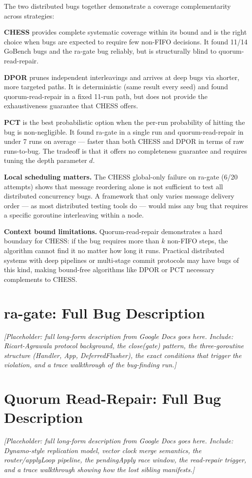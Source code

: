 \documentclass[11pt]{article}
\begin{document}
The two distributed bugs together demonstrate a coverage complementarity across strategies:

\textbf{CHESS} provides complete systematic coverage within its bound and is the right choice when bugs are expected to require few non-FIFO decisions. It found 11/14 GoBench bugs and the ra-gate bug reliably, but is structurally blind to quorum-read-repair.

\textbf{DPOR} prunes independent interleavings and arrives at deep bugs via shorter, more targeted paths. It is deterministic (same result every seed) and found quorum-read-repair in a fixed 11-run path, but does not provide the exhaustiveness guarantee that CHESS offers.

\textbf{PCT} is the best probabilistic option when the per-run probability of hitting the bug is non-negligible. It found ra-gate in a single run and quorum-read-repair in under 7 runs on average --- faster than both CHESS and DPOR in terms of raw runs-to-bug. The tradeoff is that it offers no completeness guarantee and requires tuning the depth parameter $d$.

\textbf{Local scheduling matters.} The CHESS global-only failure on ra-gate (6/20 attempts) shows that message reordering alone is not sufficient to test all distributed concurrency bugs. A framework that only varies message delivery order --- as most distributed testing tools do --- would miss any bug that requires a specific goroutine interleaving within a node.

\textbf{Context bound limitations.} Quorum-read-repair demonstrates a hard boundary for CHESS: if the bug requires more than $k$ non-FIFO steps, the algorithm cannot find it no matter how long it runs. Practical distributed systems with deep pipelines or multi-stage commit protocols may have bugs of this kind, making bound-free algorithms like DPOR or PCT necessary complements to CHESS.

\appendix

\section{ra-gate: Full Bug Description}
\label{app:ra-gate}

\textit{[Placeholder: full long-form description from Google Docs goes here. Include: Ricart-Agrawala protocol background, the close(gate) pattern, the three-goroutine structure (Handler, App, DeferredFlusher), the exact conditions that trigger the violation, and a trace walkthrough of the bug-finding run.]}

\section{Quorum Read-Repair: Full Bug Description}
\label{app:quorum-read-repair}

\textit{[Placeholder: full long-form description from Google Docs goes here. Include: Dynamo-style replication model, vector clock merge semantics, the router/applyLoop pipeline, the pendingApply race window, the read-repair trigger, and a trace walkthrough showing how the lost sibling manifests.]}
\end{document}
